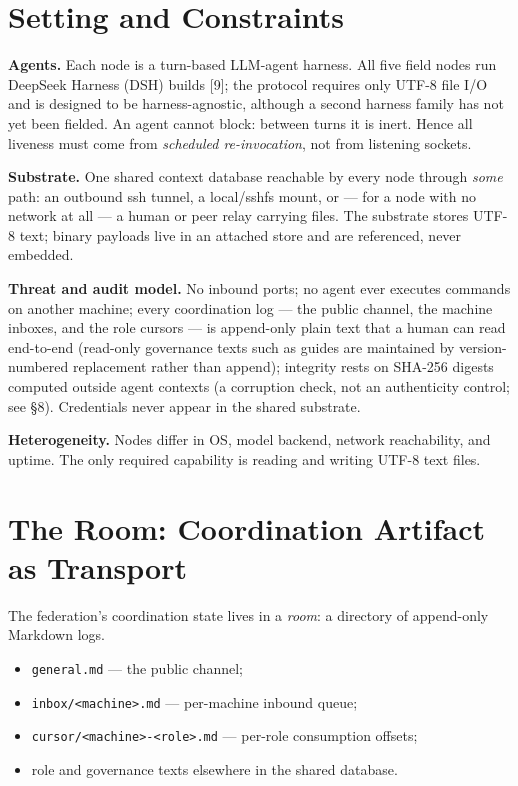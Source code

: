 \documentclass[journal]{IEEEtran}
\providecommand{\tightlist}{\setlength{\itemsep}{0pt}\setlength{\parskip}{0pt}}
\begin{document}
\section{Setting and Constraints}


\textbf{Agents.} Each node is a turn-based LLM-agent harness. All five
field nodes run DeepSeek Harness (DSH) builds {[}9{]}; the protocol
requires only UTF-8 file I/O and is designed to be harness-agnostic,
although a second harness family has not yet been fielded. An agent
cannot block: between turns it is inert. Hence all liveness must come
from \emph{scheduled re-invocation}, not from listening sockets.

\textbf{Substrate.} One shared context database reachable by every node
through \emph{some} path: an outbound ssh tunnel, a local/sshfs mount,
or --- for a node with no network at all --- a human or peer relay
carrying files. The substrate stores UTF-8 text; binary payloads live in
an attached store and are referenced, never embedded.

\textbf{Threat and audit model.} No inbound ports; no agent ever
executes commands on another machine; every coordination log --- the
public channel, the machine inboxes, and the role cursors --- is
append-only plain text that a human can read end-to-end (read-only
governance texts such as guides are maintained by version-numbered
replacement rather than append); integrity rests on SHA-256 digests
computed outside agent contexts (a corruption check, not an authenticity
control; see §8). Credentials never appear in the shared substrate.

\textbf{Heterogeneity.} Nodes differ in OS, model backend, network
reachability, and uptime. The only required capability is reading and
writing UTF-8 text files.



\section{The Room: Coordination Artifact as Transport}


The federation's coordination state lives in a \emph{room}: a directory
of append-only Markdown logs.

\begin{itemize}
\tightlist
\item
  \texttt{general.md} --- the public channel;
\item
  \texttt{inbox/\textless{}machine\textgreater{}.md} --- per-machine
  inbound queue;
\item
  \texttt{cursor/\textless{}machine\textgreater{}-\textless{}role\textgreater{}.md}
  --- per-role consumption offsets;
\item
  role and governance texts elsewhere in the shared database.
\end{itemize}
\end{document}
